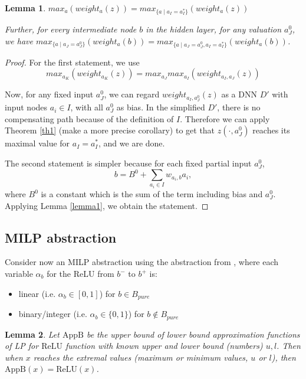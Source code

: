 \documentclass[]{article}
\newtheorem{lemma}{Lemma}
\theoremstyle{definition}
\newcommand{\ReLU}{\mathrm{ReLU}}
\begin{document}
\begin{lemma} \label{lem:reach_max}
	$max_a (weight_{a}(z)) = max_{\{a \mid a_I=a^*_I\}} (weight_{a}(z))$
	
	Further, for every intermediate node $b$ in the hidden layer, for any valuation $a^0_J$, 
	we have $max_{\{a \mid a_J=a^0_J\}} (weight_{a}(b)) = max_{\{a \mid a_J=a^0_J,a_I=a_I^*\}} (weight_{a}(b))$.	
\end{lemma}

\begin{proof}
	For the first statement, we use 
	$$max_{a_K} (weight_{a_K}(z)) = max_{a_J} max_{a_I} (weight_{a_I,a_J}(z))$$
	
	Now, for any fixed input $a^0_J$, we can regard $weight_{a_I,a^0_J}(z)$ as a DNN $D'$ with input nodes $a_i\in I$, with all $a^0_J$ %
	as bias. In the simplified $D'$, there is no compensating path because of the definition of $I$. Therefore we can apply Theorem \ref{th1} (make a more precise corollary) to get that $z(\cdot,a^0_J)$ reaches its maximal value for $a_I=a_I^*$, and we are done.
	
	The second statement is simpler because for each fixed partial input $a^0_J$, 
	$$b= B^0 +\sum_{a_i\in I} w_{a_i, b} a_i,$$ where $B^0$ is a constant which is the sum of the term including bias and $a^0_J$. Applying Lemma \ref{lemma1}, we obtain the statement.
\end{proof}

\subsection{MILP abstraction}

Consider now an MILP abstraction using the abstraction from \cite{MILP}, 
where each variable $\alpha_b$ for the ReLU from $b^-$ to $b^+$ is:
\begin{itemize}
	\item linear  (i.e. $\alpha_b \in [0,1]$) for $b \in B_{pure}$
	\item binary/integer (i.e. $\alpha_b \in \{0,1\}$) for $b \notin B_{pure}$
\end{itemize}


\begin{lemma}\label{lem:AppB=ReLU}
	Let $\mathrm{AppB}$ be the upper bound of lower bound approximation functions of LP for $\ReLU$ function with known upper and lower bound (numbers) $u,l$. Then when $x$ reaches the extremal values (maximum or minimum values, $u$ or $l$), then $\mathrm{AppB}(x)=\ReLU(x)$.
	
\end{lemma}
\end{document}
